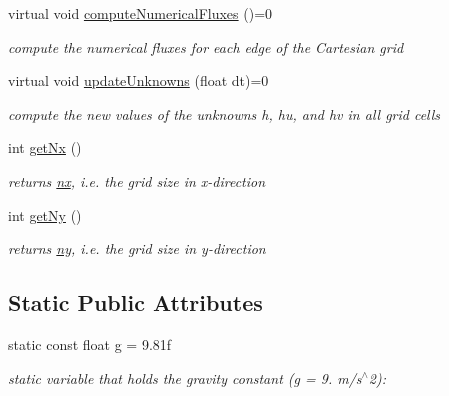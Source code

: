 \begin{DoxyCompactItemize}
virtual void \hyperlink{classSWE__Block_a94dcf2c6ae31731e4586e45628b0c00e}{compute\+Numerical\+Fluxes} ()=0
\begin{DoxyCompactList}\small\item\em compute the numerical fluxes for each edge of the Cartesian grid \end{DoxyCompactList}\item 
virtual void \hyperlink{classSWE__Block_ab2b4b659f23d5d45413dece8d2da3298}{update\+Unknowns} (float dt)=0
\begin{DoxyCompactList}\small\item\em compute the new values of the unknowns h, hu, and hv in all grid cells \end{DoxyCompactList}\item 
int \hyperlink{classSWE__Block_aa27028fa4bc13bb2d9251b09e0fdfce6}{get\+Nx} ()
\begin{DoxyCompactList}\small\item\em returns \hyperlink{classSWE__Block_a46ec0dc1157997bd255fb39924f1e2bb}{nx}, i.\+e. the grid size in x-\/direction \end{DoxyCompactList}\item 
int \hyperlink{classSWE__Block_a4b65557b6f73ffb6454dad3dbf86e9ad}{get\+Ny} ()
\begin{DoxyCompactList}\small\item\em returns \hyperlink{classSWE__Block_a3f139630d12423eb4bd7df3e45c7f5da}{ny}, i.\+e. the grid size in y-\/direction \end{DoxyCompactList}\end{DoxyCompactItemize}
\subsection*{Static Public Attributes}
\begin{DoxyCompactItemize}
\item 
static const float \hyperlink{classSWE__Block_a073ca743ff4077a7e456906be704958f}{g} = 9.\+81f
\begin{DoxyCompactList}\small\item\em static variable that holds the gravity constant (g = 9. m/s$^\wedge$2)\+: \end{DoxyCompactList}\end{DoxyCompactItemize}
